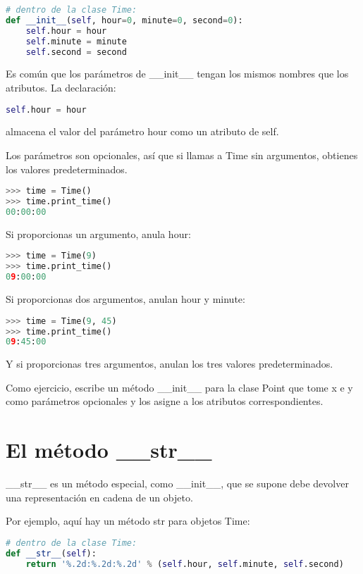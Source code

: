 \begin{lstlisting}[language=Python]
# dentro de la clase Time:
def __init__(self, hour=0, minute=0, second=0):
    self.hour = hour
    self.minute = minute
    self.second = second
\end{lstlisting}

Es común que los parámetros de \_\_init\_\_ tengan los mismos nombres que los atributos. La declaración:

\begin{lstlisting}[language=Python]
self.hour = hour
\end{lstlisting}

almacena el valor del parámetro hour como un atributo de self.

Los parámetros son opcionales, así que si llamas a Time sin argumentos, obtienes los valores predeterminados.

\begin{lstlisting}[language=Python]
>>> time = Time()
>>> time.print_time()
00:00:00
\end{lstlisting}

Si proporcionas un argumento, anula hour:

\begin{lstlisting}[language=Python]
>>> time = Time(9)
>>> time.print_time()
09:00:00
\end{lstlisting}

Si proporcionas dos argumentos, anulan hour y minute:

\begin{lstlisting}[language=Python]
>>> time = Time(9, 45)
>>> time.print_time()
09:45:00
\end{lstlisting}

Y si proporcionas tres argumentos, anulan los tres valores predeterminados.

Como ejercicio, escribe un método \_\_init\_\_ para la clase Point que tome x e y como parámetros opcionales y los asigne a los atributos correspondientes.

\section{El método \_\_str\_\_}

\_\_str\_\_ es un método especial, como \_\_init\_\_, que se supone debe devolver una representación en cadena de un objeto.

Por ejemplo, aquí hay un método str para objetos Time:

\begin{lstlisting}[language=Python]
# dentro de la clase Time:
def __str__(self):
    return '%.2d:%.2d:%.2d' % (self.hour, self.minute, self.second)
\end{lstlisting}

